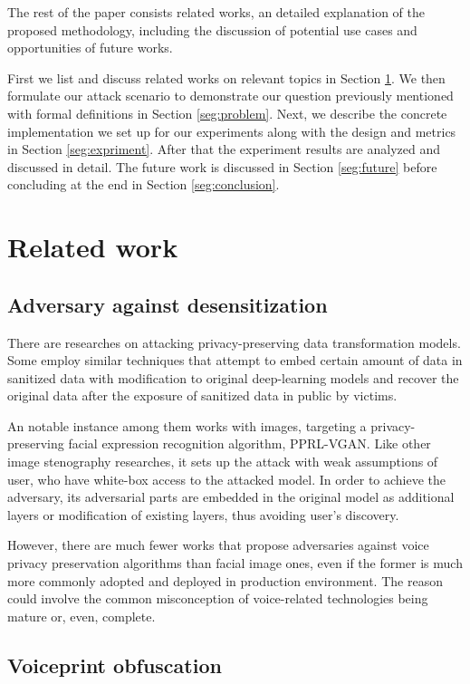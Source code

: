 \documentclass[conference]{IEEEtran}
\begin{document}
The rest of the paper consists related works, an detailed explanation of the proposed methodology, including the discussion of potential use cases and opportunities of future works.

First we list and discuss related works on relevant topics in Section \ref{seg:related}. We then formulate our attack scenario to demonstrate our question previously mentioned with formal definitions in Section \ref{seg:problem}. Next, we describe the concrete implementation we set up for our experiments along with the design and metrics in Section \ref{seg:expriment}. After that the experiment results are analyzed and discussed in detail. The future work is discussed in Section \ref{seg:future} before concluding at the end in Section \ref{seg:conclusion}.

\section{Related work}
\label{seg:related}

\subsection{Adversary against desensitization}

There are researches on attacking privacy-preserving data transformation models. Some employ similar techniques that attempt to embed certain amount of data in sanitized data with modification to original deep-learning models and recover the original data after the exposure of sanitized data in public by victims.

An notable instance among them works with images, targeting a privacy-preserving facial expression recognition algorithm, PPRL-VGAN. Like other image stenography researches\cite{imgsteno}, it sets up the attack with weak assumptions of user, who have white-box access to the attacked model. In order to achieve the adversary, its adversarial parts are embedded in the original model as additional layers or modification of existing layers, thus avoiding user's discovery.\cite{pprl-vgan,subvert}

However, there are much fewer works that propose adversaries against voice privacy preservation algorithms than facial image ones, even if the former is much more commonly adopted and deployed in production environment. The reason could involve the common misconception of voice-related technologies being mature or, even, complete.

\subsection{Voiceprint obfuscation}
\end{document}
